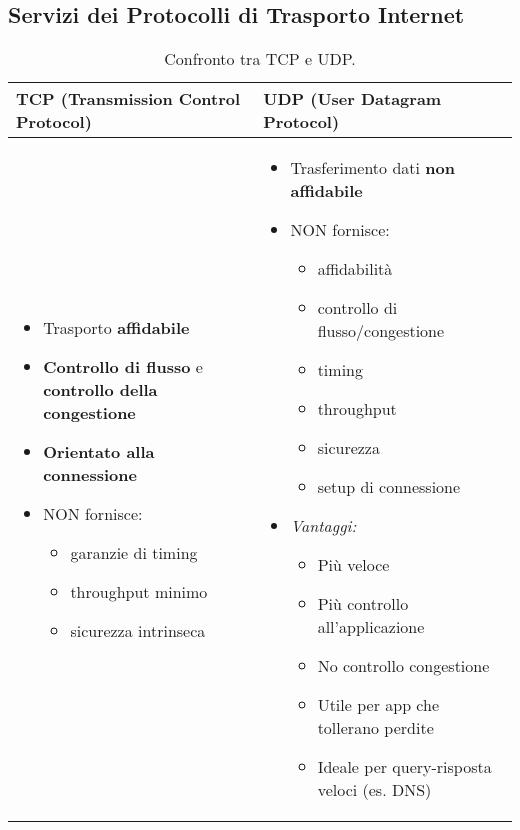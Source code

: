 \subsection{Servizi dei Protocolli di Trasporto Internet}
\begin{table}[H]
\centering
\begin{tabular}{|p{}|p{}|}
\hline
\textbf{TCP (Transmission Control Protocol)} & \textbf{UDP (User Datagram Protocol)} \\
\hline
\begin{itemize}[leftmargin=*]
    \item Trasporto \textbf{affidabile}
    \item \textbf{Controllo di flusso} e \textbf{controllo della congestione}
    \item \textbf{Orientato alla connessione}
    \item NON fornisce:
    \begin{itemize}
        \item garanzie di timing
        \item throughput minimo
        \item sicurezza intrinseca
    \end{itemize}
\end{itemize}
&
\begin{itemize}[leftmargin=*]
    \item Trasferimento dati \textbf{non affidabile}
    \item NON fornisce:
    \begin{itemize}
        \item affidabilità
        \item controllo di flusso/congestione
        \item timing
        \item throughput
        \item sicurezza
        \item setup di connessione
    \end{itemize}
    \item \textit{Vantaggi:}
    \begin{itemize}
        \item Più veloce
        \item Più controllo all'applicazione
        \item No controllo congestione
        \item Utile per app che tollerano perdite
        \item Ideale per query-risposta veloci (es. DNS)
    \end{itemize}
\end{itemize} \\
\hline
\end{tabular}
\caption{Confronto tra TCP e UDP.}
\label{tab:tcp-vs-udp}
\end{table}

